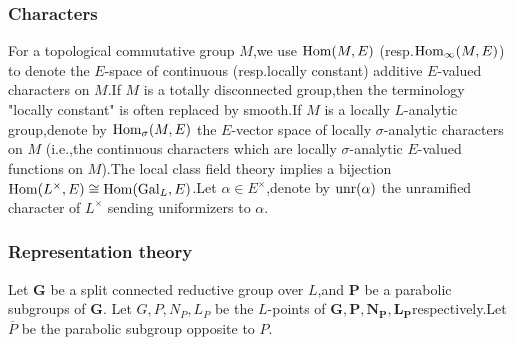 \documentclass[SecEq,CM,GP]{degruyter-crelle} %
\theoremstyle{plain}
\newcommand{\gal}{{\rm Gal}}
\newcommand{\homo}{{\rm Hom}}
\newcommand{\unr}{{\rm unr}}
\newcommand{\wt}{{\rm wt}}
\newcommand{\BQ}{{\mathbb{Q}}}
\newcommand{\bG}{{\mathbf{G}}}
\newcommand{\bL}{{\mathbf{L}}}
\newcommand{\bN}{{\mathbf{N}}}
\newcommand{\bP}{{\mathbf{P}}}
\begin{document}



\subsubsection*{Characters}
For a topological commutative group $M$,\;we use $\homo(M,E)$ (resp.\;$\homo_\infty(M,E)$) to denote the $E$-space of continuous (resp.\;locally constant) additive $E$-valued characters on $M$.\;If $M$ is a totally disconnected group,\;then the terminology "locally constant" is often replaced by smooth.\;If $M$ is a locally $L$-analytic group,\;denote by $\homo_\sigma(M,E)$ the $E$-vector space of locally $\sigma$-analytic characters on $M$ (i.e.,\;the continuous characters which are locally $\sigma$-analytic $E$-valued functions on $M$).\;The local class field theory implies a bijection $\homo(L^\times,E)\cong \homo(\gal_L,E)$.\;Let $\alpha\in E^\times$,\;denote by $\unr(\alpha)$ the unramified character of $L^\times$ sending uniformizers to $\alpha$.\;





\subsubsection*{Representation theory}
\noindent Let $\mathbf{G}$ be a split connected reductive group over $L$,\;and $\bP$ be a parabolic subgroups of $\bG$.\;
Let $G,P,N_P,L_P$ be the $L$-points of $\bG,\bP,\bN_\bP,\bL_\bP$\;respectively.\;Let $\overline{P}$ be the parabolic subgroup opposite to $P$.\;
\end{document}
